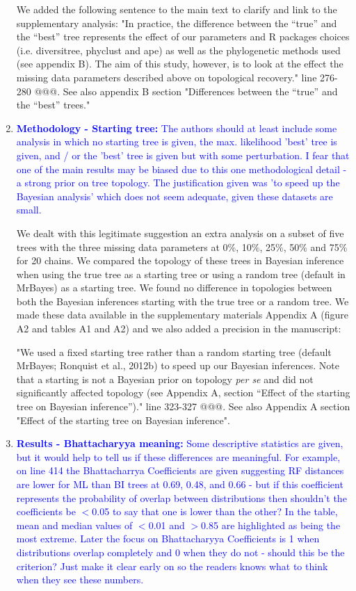 \documentclass[12pt,letterpaper]{article}
\begin{document}
\begin{enumerate}
We added the following sentence to the main text to clarify and link to the supplementary analysis:
"In practice, the difference between the ``true'' and the ``best'' tree represents the effect of our parameters and R packages choices (i.e. diversitree, phyclust and ape) as well as the phylogenetic methods used (see appendix B).
The aim of this study, however, is to look at the effect the missing data parameters described above on topological recovery." line 276-280 @@@.
See also appendix B section "Differences between the ``true'' and the ``best'' trees."


\item{\textcolor{blue}{\textbf{Methodology - Starting tree:} The authors should at least include some analysis in which no starting tree is given, the max. likelihood 'best' tree is given, and / or the 'best' tree is given but with some perturbation.
I fear that one of the main results may be biased due to this one methodological detail - a strong prior on tree topology.
The justification given was 'to speed up the Bayesian analysis' which does not seem adequate, given these datasets are small.}}

We dealt with this legitimate suggestion an extra analysis on a subset of five trees with the three missing data parameters at 0\%, 10\%, 25\%, 50\% and 75\% for 20 chains. 
We compared the topology of these trees in Bayesian inference when using the true tree as a starting tree or using a random tree (default in MrBayes) as a starting tree.
We found no difference in topologies between both the Bayesian inferences starting with the true tree or a random tree.
We made these data available in the supplementary materials Appendix A (figure A2 and tables A1 and A2) and we also added a precision in the manuscript:

"We used a fixed starting tree rather than a random starting tree (default MrBayes; Ronquist et al., 2012b) to speed up our Bayesian inferences.
Note that a starting is not a Bayesian prior on topology \textit{per se} and did not significantly affected topology (see Appendix A, section ``Effect of the starting tree on Bayesian inference'')." line 323-327 @@@.
See also Appendix A section "Effect of the starting tree on Bayesian inference".


\item{\textcolor{blue}{\textbf{Results - Bhattacharyya meaning:} Some descriptive statistics are given, but it would help to tell us if these differences are meaningful.
For example, on line 414 the Bhattacharrya Coefficients are given suggesting RF distances are lower for ML than BI trees at 0.69, 0.48, and 0.66 - but if this coefficient represents the probability of overlap between distributions then shouldn't the coefficients be $<$0.05 to say that one is lower than the other?
In the table, mean and median values of $<$0.01 and $>$0.85 are highlighted as being the most extreme.
Later the focus on Bhattacharyya Coefficients is 1 when distributions overlap completely and 0 when they do not - should this be the criterion?
Just make it clear early on so the readers knows what to think when they see these numbers. }}


\end{enumerate}
\end{document}

